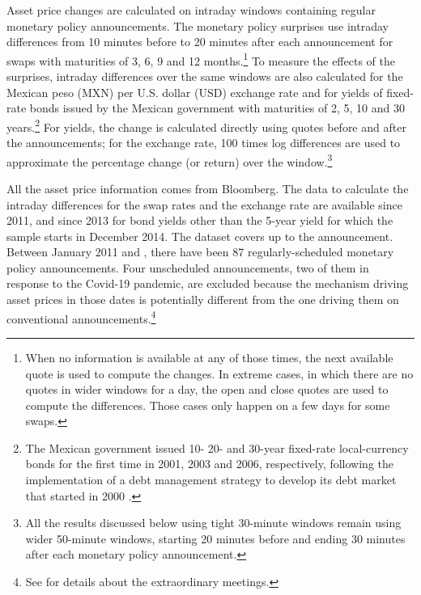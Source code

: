 {Asset price changes are calculated on intraday windows containing regular monetary policy announcements. 
The monetary policy surprises use intraday differences from 10 minutes before to 20 minutes after each announcement for swaps with maturities of 3, 6, 9 and 12 months.\footnote{When no information is available at any of those times, the next available quote is used to compute the changes. In extreme cases, in which there are no quotes in wider windows for a day, the open and close quotes are used to compute the differences. Those cases only happen on a few days for some swaps.} 
To measure the effects of the surprises, intraday differences over the same windows are also calculated for the Mexican peso (MXN) per U.S. dollar (USD) exchange rate and for yields of fixed-rate bonds issued by the Mexican government with maturities of  2, 5, 10 and 30 years.\footnote{ The Mexican government issued 10- 20- and 30-year fixed-rate local-currency bonds for the first time in 2001, 2003 and 2006, respectively, following the implementation of a debt management strategy to develop its debt market that started in 2000 \parencite{JeanneauTovar:2008,Banxico:2014}.} 
For yields, the change is calculated directly using quotes before and after the announcements; for the exchange rate, 100 times log differences are used to approximate the percentage change (or return) over the window.\footnote{ All the results discussed below using tight 30-minute windows remain using wider 50-minute windows, starting 20 minutes before and ending 30 minutes after each monetary policy announcement.} 

All the asset price information comes from Bloomberg. 
The data to calculate the intraday differences for the swap rates and the exchange rate are available since 2011, and since 2013 for bond yields other than the 5-year yield for which the sample starts in December 2014. The dataset covers up to the \lastobs{} announcement. 
Between January 2011 and \lastobs, there have been 87 regularly-scheduled monetary policy announcements. 
Four unscheduled announcements, two of them in response to the Covid-19 pandemic, are excluded because the mechanism driving asset prices in those dates is potentially different from the one driving them on conventional announcements.\footnote{See \textcite{Solis:FX} for details about the extraordinary meetings.} 

}
